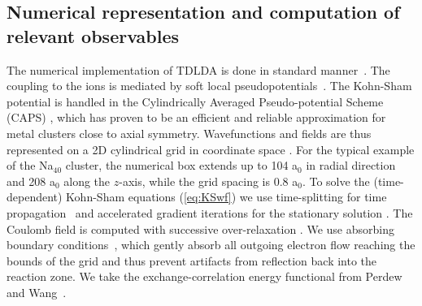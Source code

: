 \documentclass[final,1p]{elsarticle}
\begin{document}
\subsection{Numerical representation and computation of relevant observables  }
\label{sec:observ}

The numerical implementation of TDLDA is done in standard
manner~\cite{Cal00,Rei04aB}.  The coupling to the ions is mediated by
soft local pseudopotentials~\cite{Kue99}.  The Kohn-Sham potential is
handled in the Cylindrically Averaged Pseudo-potential Scheme (CAPS)
\cite{Mon94a,Mon95a}, which has proven to be an efficient and reliable
approximation for metal clusters close to axial symmetry.
Wavefunctions and fields are thus represented on a 2D cylindrical grid
in coordinate space \cite{Dav81a}.  For the typical example of the
Na$_{40}$ cluster, the numerical box extends up to 104 a$_0$ in radial
direction and 208 a$_0$ along the $z$-axis, while the grid spacing is
0.8 a$_0$. To solve the (time-dependent) Kohn-Sham equations
(\ref{eq:KSwf}) we use time-splitting for time
propagation~\cite{Fei82} and accelerated gradient iterations for the
stationary solution \cite{Blu92}. The Coulomb field is computed with
successive over-relaxation \cite{Dav81a}.  We use absorbing boundary
conditions~\cite{Cal00,Rei06c}, which gently absorb all outgoing
electron flow reaching the bounds of the grid and thus prevent
artifacts from reflection back into the reaction zone.  We take the
exchange-correlation energy functional from Perdew and
Wang~\cite{Per92}.
\end{document}
